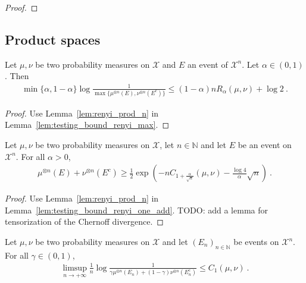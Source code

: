 \begin{proof}%
{}
\end{proof}


\subsection{Product spaces}

\begin{corollary}
  \label{cor:testing_bound_renyi_n}
  Let $\mu, \nu$ be two probability measures on $\mathcal X$ and $E$ an event of $\mathcal X^n$. Let $\alpha \in (0,1)$. Then
  \begin{align*}
  \min\{\alpha, 1 - \alpha\} \log\frac{1}{\max\{\mu^{\otimes n}(E), \nu^{\otimes n}(E^c)\}} \le (1 - \alpha) n R_{\alpha}(\mu, \nu)  + \log 2 \: .
  \end{align*}
\end{corollary}

\begin{proof}
Use Lemma~\ref{lem:renyi_prod_n} in Lemma~\ref{lem:testing_bound_renyi_max}.
\end{proof}

\begin{lemma}
  \label{lem:testing_bound_renyi_one_add_n}
  Let $\mu, \nu$ be two probability measures on $\mathcal X$, let $n \in \mathbb{N}$ and let $E$ be an event on $\mathcal X^n$. For all $\alpha > 0$,
  \begin{align*}
  \mu^{\otimes n}(E) + \nu^{\otimes n}(E^c) \ge \frac{1}{2}\exp\left( - n C_{1+\frac{\alpha}{\sqrt{n}}}(\mu, \nu) - \frac{\log 4}{\alpha}\sqrt{n}\right) \: .
  \end{align*}
\end{lemma}

\begin{proof}
Use Lemma~\ref{lem:renyi_prod_n} in Lemma~\ref{lem:testing_bound_renyi_one_add}. TODO: add a lemma for tensorization of the Chernoff divergence.
\end{proof}

\begin{theorem}
  \label{thm:testing_bound_chernoff}
  Let $\mu, \nu$ be two probability measures on $\mathcal X$ and let $(E_n)_{n \in \mathbb{N}}$ be events on $\mathcal X^n$. For all $\gamma \in (0,1)$,
  \begin{align*}
  \limsup_{n \to +\infty} \frac{1}{n}\log \frac{1}{\gamma \mu^{\otimes n}(E_n) + (1 - \gamma)\nu^{\otimes n}(E_n^c)}
  \le C_1(\mu, \nu)
  \: .
  \end{align*}
\end{theorem}

